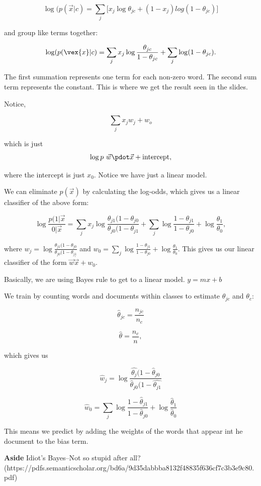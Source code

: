 $$\log(p(\vec{x}|c) = \sum_j \Bigg[ x_j \log\theta_{jc} + (1 - x_j) log(1 - \theta_{jc}) \Bigg]$$

and group like terms together:

$$\log(p(\vex{x}|c) = \sum_j x_j \log\frac{\theta_{jc}}{1 - \theta_{jc}} + \sum_j \log(1 - \theta_{jc}).$$

The first summation represents one term for each non-zero word. The second sum term represents the constant. This is where we get the result seen in the slides. 

Notice,

$$\sum_j x_j w_j + w_o$$

which is just $$\log p ~ \vec{w} \pdot \vec{x} + \text{intercept},$$

where the intercept is just $x_0$. Notice we have just a linear model.

We can eliminate $p(\vec{x})$ by calculating the log-odds, which gives us a linear classifier of the above form:

$$\log\frac{p(1 | \vec{x}}{0 | \vec{x}} = \sum_j x_j \log\frac{\theta_{j1}(1 - \theta_{j0}}{\theta_{j0}(1 - \theta_{j1}} + \sum_j \log\frac{1 - \theta_{j1}}{1 - \theta_{j0}} + \log\frac{\theta_1}{\theta_0},$$

where $w_j = \log\frac{\theta_{j1}(1 - \theta_{j0}}{\theta_{j0}(1 - \theta_{j1}}$ and $w_0 = \sum_j \log\frac{1 - \theta_{j1}}{1 - \theta_{j0}} + \log\frac{\theta_1}{\theta_0}$. This gives us our linear classifier of the form $\vec{w} \dot \vec{x} + w_0$. 

Basically, we are using Bayes rule to get to a linear model. $y=mx+b$ 

We train by counting words and documents within classes to estimate $\theta_{jc}$ and $\theta_c$:

$$\hat{\theta}_{jc} = \frac{n_{jc}}{n_c}$$

$$\hat{\theta} = \frac{n_c}{n},$$

which gives us 

$$\hat{w}_j = \log\frac{\hat{\theta_j}(1 - \hat{\theta}_{j0}}{\hat{\theta}_{j0}(1 - \hat{\theta_{j1}}}$$

$$\hat{w}_0 = \sum_j \log\frac{1 - \hat{\theta}_{j1}}{1 - \hat{\theta}_{j0}} + \log\frac{\hat{\theta}_1}{\hat{\theta}_0}$$

This means we predict by adding the weights of the words that appear int he document to the bias term. 

\textbf{Aside} Idiot's Bayes--Not so stupid after all? (https://pdfs.semanticscholar.org/bd6a/9d35dabbba8132f48835f636cf7c3b3e9c80.pdf)

